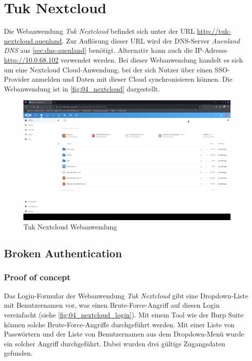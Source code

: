 \pagebreak
\chapter{Tuk Nextcloud}\label{sec:nextcloud}
Die Webanwendung \textit{Tuk Nextcloud} befindet sich unter der URL \url{http://tuk-nextcloud.auenland}. Zur Auflösung dieser URL wird der DNS-Server \textit{Auenland DNS} aus \autoref{sec:dns-auenland} benötigt. Alternativ kann auch die IP-Adresse \url{http://10.0.68.102} verwendet werden. Bei dieser Webanwendung handelt es sich um eine Nextcloud Cloud-Anwendung, bei der sich Nutzer über einen SSO-Provider anmelden und Daten mit dieser Cloud synchronisieren können. Die Webanwendung ist in \autoref{fig:04_nextcloud} dargestellt.

\vfill
\begin{figure}[!ht]
    \centering
    \includegraphics[width=\linewidth]{images/screenshots/06_nextcloud_2.png}
    \caption{Tuk Nextcloud Webanwendung}
    \label{fig:04_nextcloud}
\end{figure}
\vfill
\newpage


\section{\makecvssbadge Broken Authentication}

\subsection*{Proof of concept}
Das Login-Formular der Webanwendung \textit{Tuk Nextcloud} gibt eine Dropdown-Liste mit Benutzernamen vor, was einen Brute-Force-Angriff auf diesen Login vereinfacht (siehe \autoref{fig:04_nextcloud_login}). Mit einem Tool wie der Burp Suite können solche Brute-Force-Angriffe durchgeführt werden. Mit einer Liste von Passwörtern und der Liste von Benutzernamen aus dem Dropdown-Menü wurde ein solcher Angriff durchgeführt. Dabei wurden drei gültige Zugangsdaten gefunden.\\

